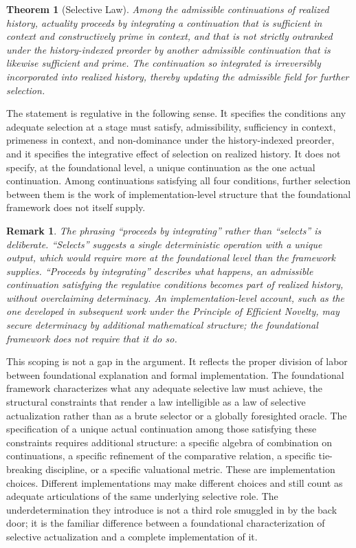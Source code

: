 \documentclass[11pt]{article}
\theoremstyle{foundation}
\newtheorem{theorem}{Theorem}
\newtheorem{remark}{Remark}
\begin{document}
\begin{theorem}[Selective Law]
Among the admissible continuations of realized history, actuality proceeds by integrating a continuation that is sufficient in context and constructively prime in context, and that is not strictly outranked under the history-indexed preorder by another admissible continuation that is likewise sufficient and prime. The continuation so integrated is irreversibly incorporated into realized history, thereby updating the admissible field for further selection.
\end{theorem}

The statement is regulative in the following sense. It specifies the conditions any adequate selection at a stage must satisfy, admissibility, sufficiency in context, primeness in context, and non-dominance under the history-indexed preorder, and it specifies the integrative effect of selection on realized history. It does not specify, at the foundational level, a unique continuation as the one actual continuation. Among continuations satisfying all four conditions, further selection between them is the work of implementation-level structure that the foundational framework does not itself supply.

\begin{remark}
The phrasing ``proceeds by integrating'' rather than ``selects'' is deliberate. ``Selects'' suggests a single deterministic operation with a unique output, which would require more at the foundational level than the framework supplies. ``Proceeds by integrating'' describes what happens, an admissible continuation satisfying the regulative conditions becomes part of realized history, without overclaiming determinacy. An implementation-level account, such as the one developed in subsequent work under the Principle of Efficient Novelty, may secure determinacy by additional mathematical structure; the foundational framework does not require that it do so.
\end{remark}

This scoping is not a gap in the argument. It reflects the proper division of labor between foundational explanation and formal implementation. The foundational framework characterizes what any adequate selective law must achieve, the structural constraints that render a law intelligible as a law of selective actualization rather than as a brute selector or a globally foresighted oracle. The specification of a unique actual continuation among those satisfying these constraints requires additional structure: a specific algebra of combination on continuations, a specific refinement of the comparative relation, a specific tie-breaking discipline, or a specific valuational metric. These are implementation choices. Different implementations may make different choices and still count as adequate articulations of the same underlying selective role. The underdetermination they introduce is not a third role smuggled in by the back door; it is the familiar difference between a foundational characterization of selective actualization and a complete implementation of it.
\end{document}
